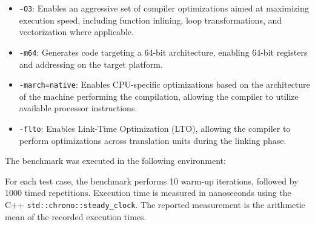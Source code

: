 \documentclass[11pt,twoside]{article}
\begin{document}
    \begin{itemize}
        \item \texttt{-O3}: Enables an aggressive set of compiler
        optimizations aimed at maximizing execution speed, including
        function inlining, loop transformations, and vectorization
        where applicable.

        \item \texttt{-m64}: Generates code targeting a 64-bit
        architecture, enabling 64-bit registers and addressing
        on the target platform.

        \item \texttt{-march=native}: Enables CPU-specific
        optimizations based on the architecture of the machine
        performing the compilation, allowing the compiler to
        utilize available processor instructions.

        \item \texttt{-flto}: Enables Link-Time Optimization (LTO),
        allowing the compiler to perform optimizations across
        translation units during the linking phase.
    \end{itemize}

    The benchmark was executed in the following environment:

    \begin{table}[ht]
        \centering
        \setlength{\tabcolsep}{6pt}
        \caption{Experimental environment and benchmark configuration}
        \label{tab:experimental-env}
    \end{table}

    For each test case, the benchmark performs 10 warm-up iterations,
    followed by 1000 timed repetitions. Execution time is measured
    in nanoseconds using the C++ \texttt{std::chrono::steady\_clock}.
    The reported measurement is the arithmetic mean of the recorded
    execution times.
\end{document}
